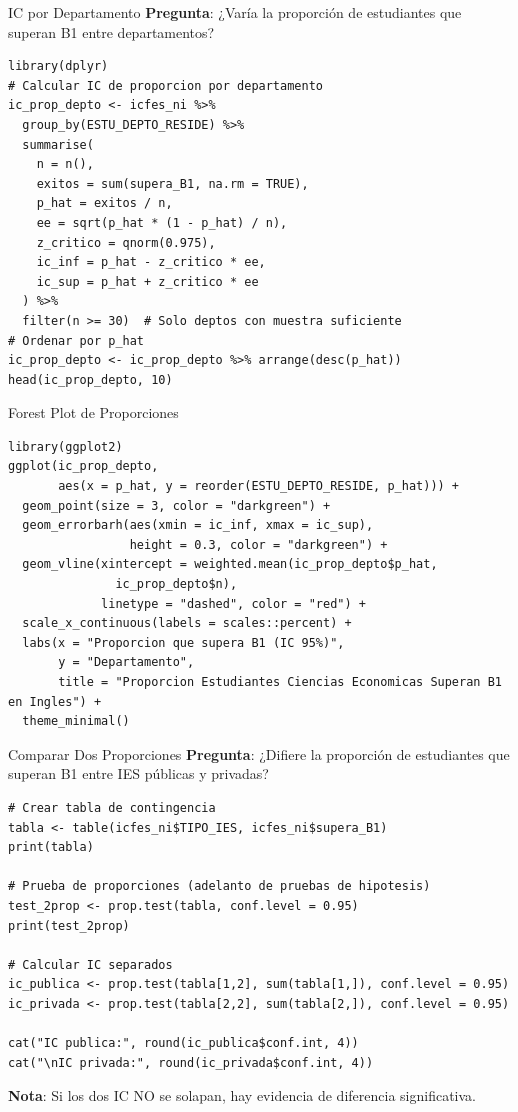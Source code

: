 \documentclass[aspectratio=169, 11pt]{beamer}
\begin{document}
\begin{frame}[fragile]{IC por Departamento}
\small
\textbf{Pregunta}: ¿Varía la proporción de estudiantes que superan B1 entre departamentos?

\begin{lstlisting}[basicstyle=\ttfamily\scriptsize]
library(dplyr)
# Calcular IC de proporcion por departamento
ic_prop_depto <- icfes_ni %>%
  group_by(ESTU_DEPTO_RESIDE) %>%
  summarise(
    n = n(),
    exitos = sum(supera_B1, na.rm = TRUE),
    p_hat = exitos / n,
    ee = sqrt(p_hat * (1 - p_hat) / n),
    z_critico = qnorm(0.975),
    ic_inf = p_hat - z_critico * ee,
    ic_sup = p_hat + z_critico * ee
  ) %>%
  filter(n >= 30)  # Solo deptos con muestra suficiente
# Ordenar por p_hat
ic_prop_depto <- ic_prop_depto %>% arrange(desc(p_hat))
head(ic_prop_depto, 10)
\end{lstlisting}
\end{frame}

\begin{frame}[fragile]{Forest Plot de Proporciones}
\begin{lstlisting}[basicstyle=\ttfamily\scriptsize]
library(ggplot2)
ggplot(ic_prop_depto,
       aes(x = p_hat, y = reorder(ESTU_DEPTO_RESIDE, p_hat))) +
  geom_point(size = 3, color = "darkgreen") +
  geom_errorbarh(aes(xmin = ic_inf, xmax = ic_sup),
                 height = 0.3, color = "darkgreen") +
  geom_vline(xintercept = weighted.mean(ic_prop_depto$p_hat,
               ic_prop_depto$n),
             linetype = "dashed", color = "red") +
  scale_x_continuous(labels = scales::percent) +
  labs(x = "Proporcion que supera B1 (IC 95%)",
       y = "Departamento",
       title = "Proporcion Estudiantes Ciencias Economicas Superan B1 en Ingles") +
  theme_minimal()
\end{lstlisting}
\end{frame}

\begin{frame}[fragile]{Comparar Dos Proporciones}
\textbf{Pregunta}: ¿Difiere la proporción de estudiantes que superan B1 entre IES públicas y privadas?

\begin{lstlisting}
# Crear tabla de contingencia
tabla <- table(icfes_ni$TIPO_IES, icfes_ni$supera_B1)
print(tabla)

# Prueba de proporciones (adelanto de pruebas de hipotesis)
test_2prop <- prop.test(tabla, conf.level = 0.95)
print(test_2prop)

# Calcular IC separados
ic_publica <- prop.test(tabla[1,2], sum(tabla[1,]), conf.level = 0.95)
ic_privada <- prop.test(tabla[2,2], sum(tabla[2,]), conf.level = 0.95)

cat("IC publica:", round(ic_publica$conf.int, 4))
cat("\nIC privada:", round(ic_privada$conf.int, 4))
\end{lstlisting}

\vspace{0.3cm}
\small
\textbf{Nota}: Si los dos IC NO se solapan, hay evidencia de diferencia significativa.
\end{frame}
\end{document}
